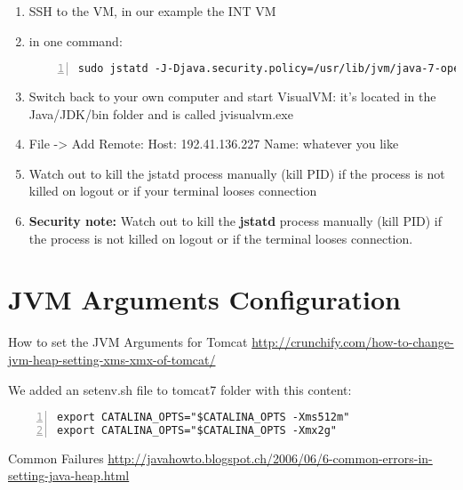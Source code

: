 \begin{enumerate}
	\item SSH to the VM, in our example the INT VM
	\item in one command:
	\begin{lstlisting}[numbers=left, breaklines=true]
	sudo jstatd -J-Djava.security.policy=/usr/lib/jvm/java-7-openjdk-amd64/bin/jstatd.all.policy -J-Djava.rmi.server.hostname=192.41.136.227
	\end{lstlisting}
	\item Switch back to your own computer and start VisualVM: it’s located in the Java/JDK/bin folder and is called jvisualvm.exe
	\item File -> Add Remote:\newline
	Host: 192.41.136.227\newline
	Name: whatever you like
	\item Watch out to kill the jstatd process manually (kill PID) if the process is not killed on logout or if your terminal looses connection
	\item \textbf{Security note:} Watch out to kill the \textbf{jstatd} process manually (kill PID) if the process is not killed on logout or if the terminal looses connection.
\end{enumerate}

\section{JVM Arguments Configuration}
How to set the JVM Arguments for Tomcat\newline
\url{http://crunchify.com/how-to-change-jvm-heap-setting-xms-xmx-of-tomcat/}

We added an setenv.sh file to tomcat7 folder with this content:
\begin{lstlisting}[numbers=left, breaklines=true]
export CATALINA_OPTS="$CATALINA_OPTS -Xms512m"
export CATALINA_OPTS="$CATALINA_OPTS -Xmx2g"	
\end{lstlisting}

Common Failures\newline
\url{http://javahowto.blogspot.ch/2006/06/6-common-errors-in-setting-java-heap.html}
